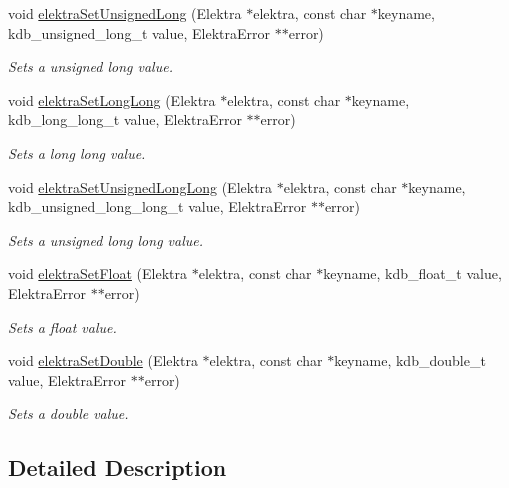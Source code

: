 \begin{DoxyCompactItemize}
void \hyperlink{group__highlevel_ga7f0fef70748854e222db829050079136}{elektra\+Set\+Unsigned\+Long} (Elektra $\ast$elektra, const char $\ast$keyname, kdb\+\_\+unsigned\+\_\+long\+\_\+t value, Elektra\+Error $\ast$$\ast$error)
\begin{DoxyCompactList}\small\item\em Sets a unsigned long value. \end{DoxyCompactList}\item 
void \hyperlink{group__highlevel_gaa91c0a9b907afdb1f8b202804be36f6f}{elektra\+Set\+Long\+Long} (Elektra $\ast$elektra, const char $\ast$keyname, kdb\+\_\+long\+\_\+long\+\_\+t value, Elektra\+Error $\ast$$\ast$error)
\begin{DoxyCompactList}\small\item\em Sets a long long value. \end{DoxyCompactList}\item 
void \hyperlink{group__highlevel_ga4aba418539ac27449193b8f8cb761734}{elektra\+Set\+Unsigned\+Long\+Long} (Elektra $\ast$elektra, const char $\ast$keyname, kdb\+\_\+unsigned\+\_\+long\+\_\+long\+\_\+t value, Elektra\+Error $\ast$$\ast$error)
\begin{DoxyCompactList}\small\item\em Sets a unsigned long long value. \end{DoxyCompactList}\item 
void \hyperlink{group__highlevel_gae9f490191adb55639c70501e1ca3fbe8}{elektra\+Set\+Float} (Elektra $\ast$elektra, const char $\ast$keyname, kdb\+\_\+float\+\_\+t value, Elektra\+Error $\ast$$\ast$error)
\begin{DoxyCompactList}\small\item\em Sets a float value. \end{DoxyCompactList}\item 
void \hyperlink{group__highlevel_ga803c1b5131516de24bc81c94aca44bbd}{elektra\+Set\+Double} (Elektra $\ast$elektra, const char $\ast$keyname, kdb\+\_\+double\+\_\+t value, Elektra\+Error $\ast$$\ast$error)
\begin{DoxyCompactList}\small\item\em Sets a double value. \end{DoxyCompactList}\end{DoxyCompactItemize}


\subsection{Detailed Description}


